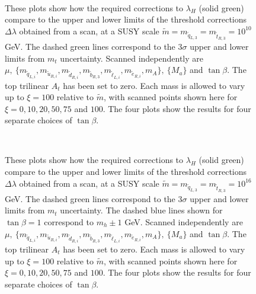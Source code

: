 \documentclass[12pt]{article}
\newcommand{\sq}{\tilde{q}}
\newcommand{\mStL}{m_{\sq_{L,3}}}
\newcommand{\mSqL}{m_{\sq_{L,i}}}
\newcommand{\mStR}{m_{\tilde{t}_{R,3}}}
\newcommand{\mSbR}{m_{\tilde{b}_{R,3}}}
\newcommand{\mSuR}{m_{\tilde{u}_{R,i}}}
\newcommand{\mSdR}{m_{\tilde{d}_{R,i}}}
\newcommand{\mSeR}{m_{\tilde{e}_{R,i}}}
\newcommand{\mSlL}{m_{\tilde{\ell}_{L,i}}}
\newcommand{\mS}{\tilde{m}}
\begin{document}
\begin{figure}[H]
\centering
{}
\\
\caption{
These plots show how the required corrections to $\lambda_H$ (solid green) compare to the upper and lower limits of the threshold corrections $\Delta\lambda$ obtained from a scan, at a SUSY scale $\mS = \mStL=\mStR = 10^{10}$ GeV. 
The dashed green lines correspond to the $3\sigma$ upper and lower limits from $m_t$ uncertainty. 
Scanned independently are $ \mu,~ \{ \mSqL, \mSuR, \mSdR, \mSbR, \mSlL, \mSeR, m_A \},~ \{ M_a\}$ and $\tan\beta$. The top trilinear $A_t$ has been set to zero. Each mass is allowed to vary up to $\xi=100$ relative to $\mS$, with scanned points shown here for $\xi=0,10,20,50,75$ and $100$. The four plots show the results for four separate choices of $\tan \beta$.
}

\label{10Vary.FIG}
\end{figure}

\begin{figure}[H]
\centering
{}
\\
\caption{
These plots show how the required corrections to $\lambda_H$ (solid green) compare to the upper and lower limits of the threshold corrections $\Delta\lambda$ obtained from a scan, at a SUSY scale $\mS = \mStL=\mStR = 10^{16}$ GeV. 
The dashed green lines correspond to the $3\sigma$ upper and lower limits from $m_t$ uncertainty. The dashed blue lines shown for $\tan\beta=1$ correspond to $m_h \pm 1$ GeV.
Scanned independently are $ \mu,~ \{ \mSqL, \mSuR, \mSdR, \mSbR, \mSlL, \mSeR, m_A \},~ \{ M_a\}$ and $\tan\beta$. The top trilinear $A_t$ has been set to zero. Each mass is allowed to vary up to $\xi=100$ relative to $\mS$, with scanned points shown here for $\xi=0,10,20,50,75$ and $100$. The four plots show the results for four separate choices of $\tan \beta$.
}

\label{16Vary.FIG}
\end{figure}
\end{document}
